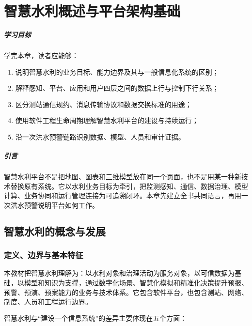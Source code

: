 \chapter{智慧水利概述与平台架构基础}

\paragraph*{学习目标}

学完本章，读者应能够：

\begin{enumerate}
\item 说明智慧水利的业务目标、能力边界及其与一般信息化系统的区别；
\item 解释感知、平台、应用和用户四层之间的数据上行与控制下行关系；
\item 区分测站通信规约、消息传输协议和数据交换标准的用途；
\item 使用软件工程生命周期理解智慧水利平台的建设与持续运行；
\item 沿一次洪水预警链路识别数据、模型、人员和审计证据。
\end{enumerate}

\paragraph*{引言}

智慧水利平台不是把地图、图表和三维模型放在同一个页面，也不是用某一种新技术替换原有系统。它以水利业务目标为牵引，把监测感知、通信、数据治理、模型计算、业务协同和运行管理连接为可追溯闭环。本章先建立全书共同语言，再用一次洪水预警说明平台如何工作。

\section{智慧水利的概念与发展}

\subsection{定义、边界与基本特征}

本教材把智慧水利理解为：以水利对象和治理活动为服务对象，以可信数据为基础，以模型和知识为支撑，通过数字化场景、智慧化模拟和精准化决策提升预报、预警、预演、预案能力的业务与技术体系。它包含软件平台，也包含测站、网络、制度、人员和工程运行边界。

智慧水利与“建设一个信息系统”的差异主要体现在五个方面：

